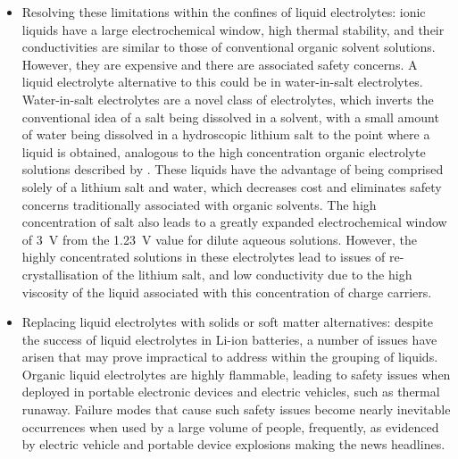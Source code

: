 \documentclass[../main.tex]{subfiles}
\begin{document}
\begin{itemize}
    \item Resolving these limitations within the confines of liquid electrolytes: ionic liquids have a large electrochemical window, high thermal stability, and their conductivities are similar to those of conventional organic solvent solutions.\cite{macfarlane2014energy} However, they are expensive and there are associated safety concerns.\cite{kralisch2005energetic, smiglak2006combustible} A liquid electrolyte alternative to this could be in water-in-salt electrolytes. Water-in-salt electrolytes are a novel class of electrolytes, which inverts the conventional idea of a salt being dissolved in a solvent, with a small amount of water being dissolved in a hydroscopic lithium salt to the point where a liquid is obtained,\cite{suo2015water,chen2020water} analogous to the high concentration organic electrolyte solutions described by \cite{Yamada_2013}. These liquids have the advantage of being comprised solely of a lithium salt and water, which decreases cost and eliminates safety concerns traditionally associated with organic solvents. The high concentration of salt also leads to a greatly expanded electrochemical window of 3~V \cite{suo2016advanced} from the 1.23~V value for dilute aqueous solutions. However, the highly concentrated solutions in these electrolytes lead to issues of re-crystallisation of the lithium salt, and low conductivity due to the high viscosity of the liquid associated with this concentration of charge carriers\cite{chen2020water,li_transport_2019}.

    \item Replacing liquid electrolytes with solids or soft matter alternatives: despite the success of liquid electrolytes in Li-ion batteries, a number of issues have arisen that may prove impractical to address within the grouping of liquids. Organic liquid electrolytes are highly flammable, leading to safety issues when deployed in portable electronic devices and electric vehicles, such as thermal runaway.\cite{Shepherd_Siddiqui, McCurry_2017, Pfrang2017} Failure modes that cause such safety issues become nearly inevitable occurrences when used by a large volume of people, frequently, as evidenced by electric vehicle and portable device explosions making the news headlines. 
    

\end{itemize}
\end{document}
